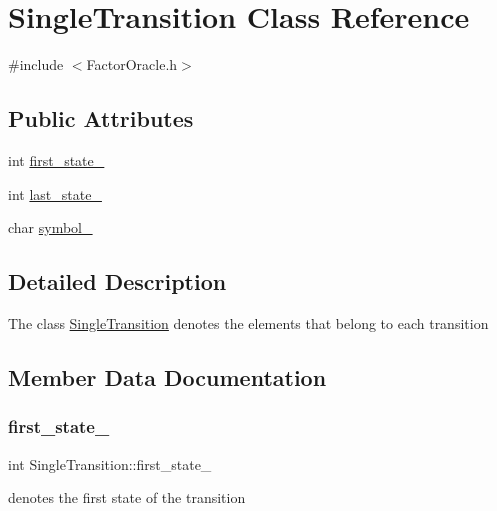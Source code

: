 \hypertarget{class_single_transition}{}\section{Single\+Transition Class Reference}
\label{class_single_transition}


{\ttfamily \#include $<$Factor\+Oracle.\+h$>$}

\subsection*{Public Attributes}
\begin{DoxyCompactItemize}
\item 
int \mbox{\hyperlink{class_single_transition_a88f7e002e072ffe7bb5eeb168cf0fea6}{first\+\_\+state\+\_\+}}
\item 
int \mbox{\hyperlink{class_single_transition_a9d07ad3e0f9d7728919a372111313c69}{last\+\_\+state\+\_\+}}
\item 
char \mbox{\hyperlink{class_single_transition_ae632ebd30fd4818e999fd1009cb2a8f9}{symbol\+\_\+}}
\end{DoxyCompactItemize}


\subsection{Detailed Description}
The class \mbox{\hyperlink{class_single_transition}{Single\+Transition}} denotes the elements that belong to each transition 

\subsection{Member Data Documentation}
\mbox{\label{class_single_transition_a88f7e002e072ffe7bb5eeb168cf0fea6}} 
\subsubsection{\texorpdfstring{first\_state\_}{first\_state\_}}
{\footnotesize\ttfamily int Single\+Transition\+::first\+\_\+state\+\_\+}

denotes the first state of the transition \mbox{\label{class_single_transition_a9d07ad3e0f9d7728919a372111313c69}} 
